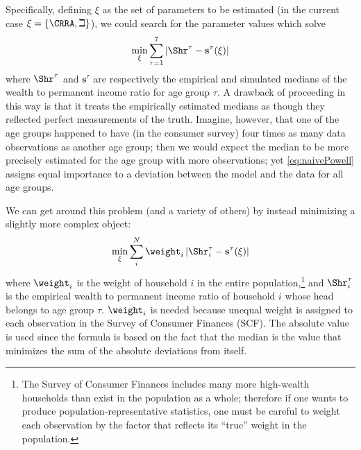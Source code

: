 \documentclass[titlepage, headings=optiontotocandhead]{econtex}
\begin{document}
Specifically, defining $\xi$ as the set of parameters
to be estimated (in the current case $\xi =\{\CRRA ,\beth\}$), we could search for
the parameter values which solve
  \begin{equation}
    \begin{gathered}
      \begin{aligned}
        \min_{\xi} \sum_{\tau=1}^{7} |\Shr^{\tau} -\mathbf{s}^{\tau}(\xi)|  \label{eq:naivePowell}
      \end{aligned}
    \end{gathered}
  \end{equation}
where $\Shr^{\tau }$ and $\mathbf{s}^{\tau}$ are respectively the empirical
and simulated medians of the wealth to permanent income ratio for age group $\tau$.
A drawback of proceeding in this way is that it treats the empirically
estimated medians as though they reflected perfect measurements of the
truth. Imagine, however, that one of the age groups happened to have
(in the consumer survey) four times as many data observations as
another age group; then we would expect the median to be more
precisely estimated for the age group with more observations; yet
\eqref{eq:naivePowell} assigns equal importance to a deviation between
the model and the data for all age groups.

We can get around this problem (and a variety of others) by instead minimizing a slightly more complex object:
  \begin{equation}
    \min_{\xi}\sum_{i}^{N}\weight _{i}\left|\Shr_{i}^{\tau }-\mathbf{s}^{\tau}(\xi )\right|\label{eq:StructEstim}
  \end{equation}
where $\weight_{i}$ is the weight of household $i$ in the entire
population,\footnote{The Survey of Consumer Finances includes many
  more high-wealth households than exist in the population as a whole;
  therefore if one wants to produce population-representative
  statistics, one must be careful to weight each observation by the
  factor that reflects its ``true'' weight in the population.} and
$\Shr_{i}^{\tau }$ is the empirical wealth to permanent income
ratio of household $i$ whose head belongs to age group
$\tau$. $\weight _{i}$ is needed because unequal weight is assigned to
each observation in the Survey of Consumer Finances (SCF). The
absolute value is used since the formula is based on the fact that the
median is the value that minimizes the sum of the absolute deviations
from itself.

\end{document}
